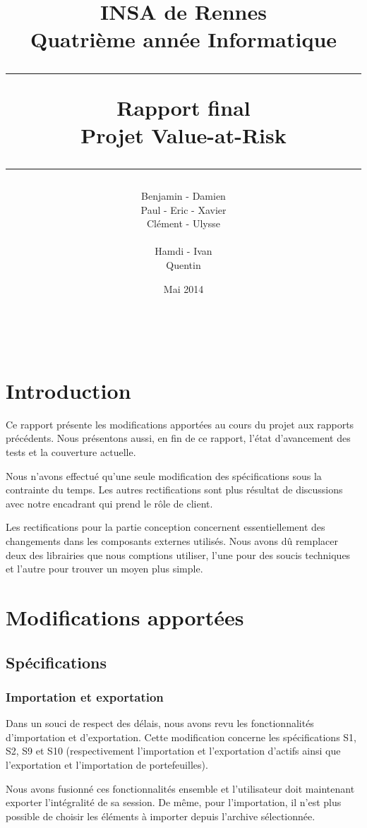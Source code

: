 \documentclass[a4paper,titlepage,french]{report}
\title{INSA de Rennes \\ Quatrième année Informatique \\ \bigskip \hrule \bigskip Rapport final \\ \bigskip Projet Value-at-Risk \bigskip \hrule}
\author{Benjamin \bsc{Bouguet} - Damien \bsc{Carduner} \\Paul \bsc{Chaignon} - Eric \bsc{Chauty} - Xavier \bsc{Fraboulet} \\ Clément \bsc{Gautrais} - Ulysse \bsc{Goarant} \\ ~~\\
Hamdi \bsc{Raissi} - Ivan \bsc{Le Plumey} \\ Quentin \bsc{Giai Gianetto}}
\date{Mai 2014}
\begin{document}
\maketitle

\thispagestyle{empty}
\newpage

~~
\thispagestyle{empty}
\newpage

\tableofcontents
\newpage


\chapter*{Introduction}

Ce rapport présente les modifications apportées au cours du projet aux rapports précédents.
Nous présentons aussi, en fin de ce rapport, l'état d'avancement des tests et la couverture actuelle.

Nous n'avons effectué qu'une seule modification des spécifications sous la contrainte du temps.
Les autres rectifications sont plus résultat de discussions avec notre encadrant qui prend le rôle de client.

Les rectifications pour la partie conception concernent essentiellement des changements dans les composants externes utilisés.
Nous avons dû remplacer deux des librairies que nous comptions utiliser, l'une pour des soucis techniques et l'autre pour trouver un moyen plus simple.


\chapter{Modifications apportées}

\section{Spécifications}

\subsection{Importation et exportation}

Dans un souci de respect des délais, nous avons revu les fonctionnalités d'importation et d'exportation.
Cette modification concerne les spécifications S1, S2, S9 et S10 (respectivement l'importation et l'exportation d'actifs ainsi que l'exportation et l'importation de portefeuilles).

Nous avons fusionné ces fonctionnalités ensemble et l'utilisateur doit maintenant exporter l'intégralité de sa session.
De même, pour l'importation, il n'est plus possible de choisir les éléments à importer depuis l'archive sélectionnée.
\end{document}
